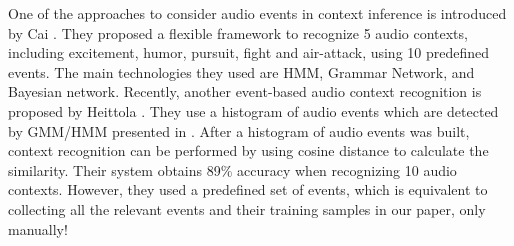 One of the approaches to consider audio events in context inference 
is introduced by Cai \et{}. 
They proposed a flexible framework to recognize 5 audio contexts, 
including excitement, humor, pursuit, fight and air-attack, 
using 10 predefined events. The main technologies they used are HMM, 
Grammar Network, and Bayesian network. 
Recently, another event-based audio context recognition is 
proposed by Heittola \et{}. 
They use a histogram of audio events which are detected by 
GMM/HMM presented in \cite{mesaros2010acoustic}. 
After a histogram of audio events was built, context recognition can 
be performed by using cosine distance to calculate 
the similarity. Their system obtains 89\% accuracy when recognizing 
10 audio contexts. However, they used a predefined set
of events, which is equivalent to collecting all the relevant events and their
training samples in our paper, only manually!

